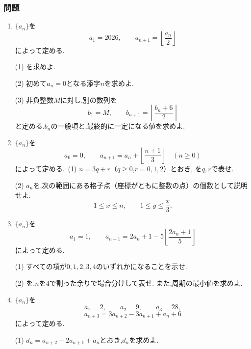 \subsubsection{問題}\label{節：発展・特殊型：問題}
\begin{enumerate}[label=\textbf{問\arabic*.},leftmargin=3.8em,format=\bookitemlink{practice-special}{problem}{hint}]
  \item {}$\{a_n\}$を
    \[
      a_1=2026,\qquad
      a_{n+1}=\left\lfloor\frac{a_n}{2}\right\rfloor
    \]
    によって定める.
    \par\smallskip\noindent
    (1) を求めよ.
    \par\smallskip\noindent
    (2) 初めて$a_n=0$となる添字$n$を求めよ.
    \par\smallskip\noindent
    (3) 非負整数$M$に対し,別の数列を
    \[
      b_1=M,\qquad
      b_{n+1}=\left\lfloor\frac{b_n+6}{2}\right\rfloor
    \]
    と定める.$b_n$の一般項と,最終的に一定になる値を求めよ.
  \item {}$\{a_n\}$を
    \[
      a_0=0,\qquad
      a_{n+1}=a_n+\left\lfloor\frac{n+1}{3}\right\rfloor
      \quad(n\ge0)
    \]
    によって定める.\,
    (1) $n=3q+r$（$q\ge0$,$r=0,1,2$）とおき,
    を$q,r$で表せ.
    \par\smallskip\noindent
    (2) $a_n$を,次の範囲にある格子点（座標がともに整数の点）の個数として説明せよ.
    \[
      1\le x\le n,\qquad 1\le y\le\frac{x}{3}.
    \]
  \item {}$\{a_n\}$を
    \[
      a_1=1,\qquad
      a_{n+1}=2a_n+1
      -5\left\lfloor\frac{2a_n+1}{5}\right\rfloor
    \]
    によって定める.
    \par\smallskip\noindent
    (1) すべての項が$0,1,2,3,4$のいずれかになることを示せ.
    \par\smallskip\noindent
    (2) を,$n$を$4$で割った余りで場合分けして表せ.
    また,周期の最小値を求めよ.
  \item {}$\{a_n\}$を
    \[
      a_1=2,\qquad a_2=9,\qquad a_3=28,
    \]
    \[
      a_{n+3}=3a_{n+2}-3a_{n+1}+a_n+6
    \]
    によって定める.
    \par\smallskip\noindent
    (1) $d_n=a_{n+2}-2a_{n+1}+a_n$とおき,$d_n$を求めよ.
    \par\smallskip\noindent

\end{enumerate}
